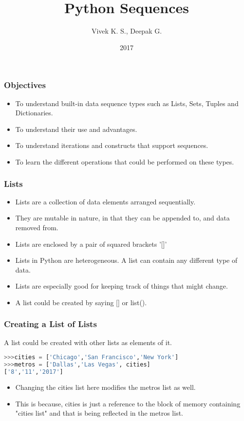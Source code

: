 \documentclass{beamer}
\title{Python Sequences}
\author{Vivek K. S., Deepak G.}
\institute{Information Systems Decision Sciences (ISDS)\\
MUMA College of Business\\
University of South Florida \\
Tampa, Florida}
\date{2017}
\begin{document}
\frame{\titlepage}
\begin{frame}
\frametitle{Objectives}
\begin{itemize}
\item To understand built-in data sequence types such as Lists, Sets, Tuples and Dictionaries.
\item To understand their use and advantages.
\item To understand iterations and constructs that support sequences.
\item To learn the different operations that could be performed on these types.
\end{itemize}
\end{frame}
\begin{frame}
\frametitle{Lists}
\begin{itemize}
\item Lists are a collection of data elements arranged sequentially.
\item They are mutable in nature, in that they can be appended to, and data removed from.
\item Lists are enclosed by a pair of squared brackets '[]'
\item Lists in Python are heterogeneous. A list can contain any different type of data.
\item Lists are especially good for keeping track of things that might change.
\item A list could be created by saying [] or list().
\end{itemize}
\end{frame}


\begin{frame}[fragile]
\frametitle{Creating a List of Lists}
A list could be created with other lists as elements of it.
\begin{lstlisting}[language=Python]
>>>cities = ['Chicago','San Francisco','New York']
>>>metros = ['Dallas','Las Vegas', cities]
['8','11','2017']
\end{lstlisting}
\begin{itemize}
\item Changing the cities list here modifies the  metros list as well.
\item This is because, cities is just a reference to the block of memory containing "cities list" and that is being reflected in the metros list.
\end{itemize}
\end{frame}
\end{document}

